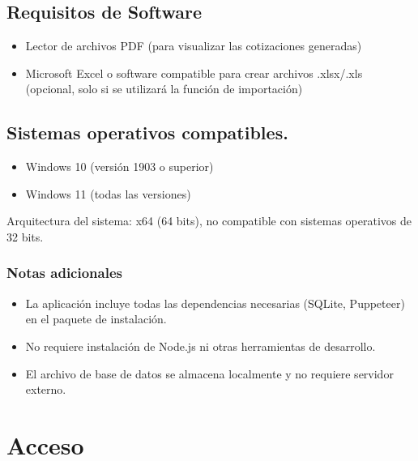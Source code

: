 \documentclass{Pretexto/bluereport}
\begin{document}
\begin{center}
\begin{tcolorbox}[
    enhanced,
    boxrule=2pt,
    colframe=primaryblue,
    colback=light,
    rounded corners=5pt,
    width=0.98\textwidth
]
\begin{tabular}{>{\raggedright\bfseries}p{3.5cm} 
                >{\raggedright\arraybackslash}p{9.5cm}}
\end{tabular}
\end{tcolorbox}
\end{center}


\subsection{Requisitos de Software}
\begin{itemize}
    \item Lector de archivos PDF (para visualizar las cotizaciones generadas)
    \item Microsoft Excel o software compatible para crear archivos .xlsx/.xls (opcional, solo si se utilizará la función de importación)
\end{itemize}

\subsection{Sistemas operativos compatibles.}
\begin{itemize}
    \item Windows 10 (versión 1903 o superior)
    \item Windows 11 (todas las versiones)
\end{itemize}

Arquitectura del sistema: x64 (64 bits), no compatible con sistemas operativos de 32 bits.

\subsubsection{Notas adicionales}
\begin{itemize}
    \item La aplicación incluye todas las dependencias necesarias (SQLite, Puppeteer) en el paquete de instalación.
    \item No requiere instalación de Node.js ni otras herramientas de desarrollo.
    \item El archivo de base de datos se almacena localmente y no requiere servidor externo.
\end{itemize}


\section{Acceso}
\end{document}
